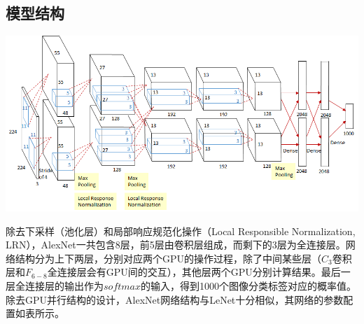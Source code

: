 \documentclass[12pt,a4paper,UTF8,twoside]{book}
\begin{document}
\hypertarget{ux6a21ux578bux7ed3ux6784-1}{%
\subsection{模型结构}\label{ux6a21ux578bux7ed3ux6784-1}}

\begin{center}\includegraphics[width=0.7\linewidth]{img/02-03} \end{center}

除去下采样（池化层）和局部响应规范化操作（Local Responsible Normalization, LRN），AlexNet一共包含8层，前5层由卷积层组成，而剩下的3层为全连接层。网络结构分为上下两层，分别对应两个GPU的操作过程，除了中间某些层（\(C_3\)卷积层和\(F_{6-8}\)全连接层会有GPU间的交互），其他层两个GPU分别计算结果。最后一层全连接层的输出作为\(softmax\)的输入，得到1000个图像分类标签对应的概率值。除去GPU并行结构的设计，AlexNet网络结构与LeNet十分相似，其网络的参数配置如表所示。
\end{document}
